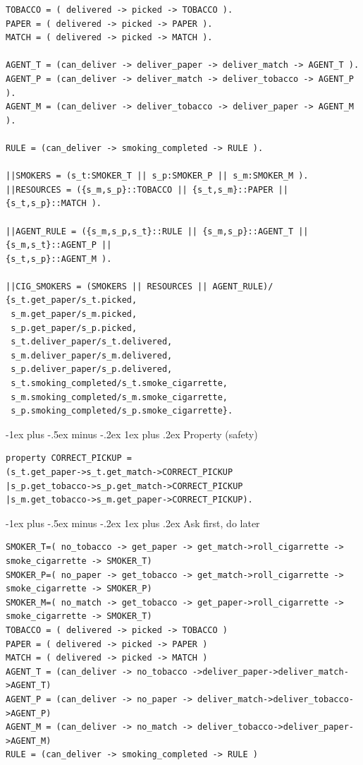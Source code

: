 \documentclass[letterpaper, 8pt]{extarticle}
\makeatletter
\renewcommand{\subsubsection}{\@startsection{subsubsection}{3}{0mm}%
                                {-1ex plus -.5ex minus -.2ex}%
                                {1ex plus .2ex}%
                                {\normalfont\tiny\bfseries}}
\makeatother
\begin{document}
\begin{multicols*}{5}
\begin{lstlisting}
TOBACCO = ( delivered -> picked -> TOBACCO ).
PAPER = ( delivered -> picked -> PAPER ).
MATCH = ( delivered -> picked -> MATCH ).

AGENT_T = (can_deliver -> deliver_paper -> deliver_match -> AGENT_T ).
AGENT_P = (can_deliver -> deliver_match -> deliver_tobacco -> AGENT_P ).
AGENT_M = (can_deliver -> deliver_tobacco -> deliver_paper -> AGENT_M ).

RULE = (can_deliver -> smoking_completed -> RULE ).

||SMOKERS = (s_t:SMOKER_T || s_p:SMOKER_P || s_m:SMOKER_M ).
||RESOURCES = ({s_m,s_p}::TOBACCO || {s_t,s_m}::PAPER || {s_t,s_p}::MATCH ).

||AGENT_RULE = ({s_m,s_p,s_t}::RULE || {s_m,s_p}::AGENT_T || {s_m,s_t}::AGENT_P ||
{s_t,s_p}::AGENT_M ).

||CIG_SMOKERS = (SMOKERS || RESOURCES || AGENT_RULE)/
{s_t.get_paper/s_t.picked,
 s_m.get_paper/s_m.picked,
 s_p.get_paper/s_p.picked,
 s_t.deliver_paper/s_t.delivered,
 s_m.deliver_paper/s_m.delivered,
 s_p.deliver_paper/s_p.delivered,
 s_t.smoking_completed/s_t.smoke_cigarrette,
 s_m.smoking_completed/s_m.smoke_cigarrette,
 s_p.smoking_completed/s_p.smoke_cigarrette}.
\end{lstlisting}

  \subsubsection{Property (safety)}
  \begin{lstlisting}
property CORRECT_PICKUP =
(s_t.get_paper->s_t.get_match->CORRECT_PICKUP
|s_p.get_tobacco->s_p.get_match->CORRECT_PICKUP
|s_m.get_tobacco->s_m.get_paper->CORRECT_PICKUP).
\end{lstlisting}

  \subsubsection{Ask first, do later}
  \begin{lstlisting}
SMOKER_T=( no_tobacco -> get_paper -> get_match->roll_cigarrette ->
smoke_cigarrette -> SMOKER_T)
SMOKER_P=( no_paper -> get_tobacco -> get_match->roll_cigarrette ->
smoke_cigarrette -> SMOKER_P)
SMOKER_M=( no_match -> get_tobacco -> get_paper->roll_cigarrette ->
smoke_cigarrette -> SMOKER_T)
TOBACCO = ( delivered -> picked -> TOBACCO )
PAPER = ( delivered -> picked -> PAPER )
MATCH = ( delivered -> picked -> MATCH )
AGENT_T = (can_deliver -> no_tobacco ->deliver_paper->deliver_match->AGENT_T)
AGENT_P = (can_deliver -> no_paper -> deliver_match->deliver_tobacco->AGENT_P)
AGENT_M = (can_deliver -> no_match -> deliver_tobacco->deliver_paper->AGENT_M)
RULE = (can_deliver -> smoking_completed -> RULE )


\end{lstlisting}
\end{multicols*}
\end{document}
